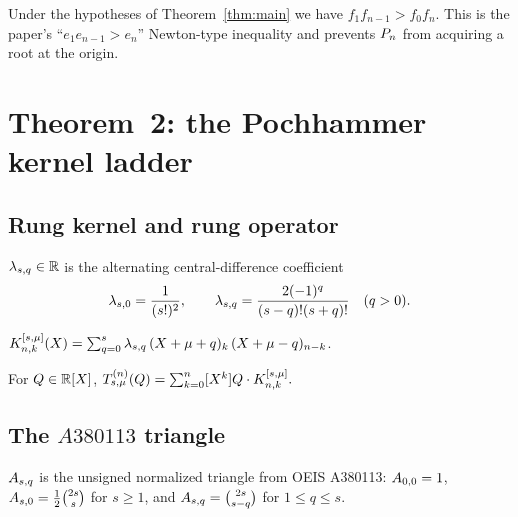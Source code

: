 \begin{lemma}[$f_1 f_{n-1} > f_0 f_n$]
  \label{lem:cauchy_schwarz_f1_fn1_gt_f0_fn}
  \leanok
  Under the hypotheses of Theorem~\ref{thm:main} we have
  $f_1 f_{n-1} > f_0 f_n$.  This is the paper's
  ``$e_1 e_{n-1} > e_n$'' Newton-type inequality and prevents
  $\Pn$ from acquiring a root at the origin.
\end{lemma}

\chapter{Theorem~2: the Pochhammer kernel ladder}
\label{ch:theorem2}

\section{Rung kernel and rung operator}

\begin{definition}
  \label{def:lambda}
  \leanok
  $\lcoef{s}{q} \in \RR$ is the alternating central-difference
  coefficient
  \[
    \lcoef{s}{0}=\frac{1}{(s!)^2}, \qquad
    \lcoef{s}{q}=\frac{2(-1)^q}{(s-q)!(s+q)!}\quad(q>0).
  \]
\end{definition}

\begin{definition}
  \label{def:rungKernel}
  \leanok
  $\Krung{n}{k}{s}{\mu}(X)
   = \sum_{q=0}^{s}\lcoef{s}{q}\,
      \Poch{X+\mu+q}{k}\,\Poch{X+\mu-q}{n-k}$.
\end{definition}

\begin{definition}
  \label{def:rungOperator}
  \leanok
  For $Q \in \RR[X]$, $T_{s,\mu}^{(n)}(Q) = \sum_{k=0}^{n}
        [X^k]Q \cdot \Krung{n}{k}{s}{\mu}.$
\end{definition}

\section{The $A380113$ triangle}

\begin{definition}[$A_{s,q}$ triangle]
  \label{def:A380113}
  \leanok
  $\Atriangle{s}{q}$ is the unsigned normalized triangle from OEIS
  A380113: $\Atriangle{0}{0}=1$,
  $\Atriangle{s}{0}=\frac12\binom{2s}{s}$ for $s\geq1$, and
  $\Atriangle{s}{q}=\binom{2s}{s-q}$ for $1\leq q\leq s$.
\end{definition}

